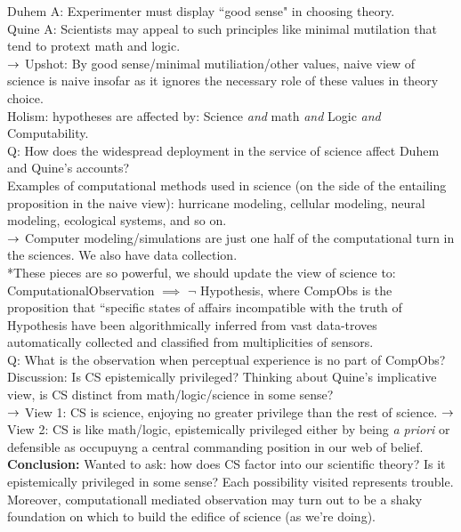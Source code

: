 Duhem A: Experimenter must display ``good sense" in choosing theory. \\

Quine A: Scientists may appeal to such principles like minimal mutilation that tend to protext math and logic. \\

$\rightarrow$ Upshot: By good sense/minimal mutiliation/other values, naive view of science is naive insofar as it ignores the necessary role of these values in theory choice. \\

Holism: hypotheses are affected by: Science {\it and} math {\it and} Logic {\it and} Computability. \\

Q: How does the widespread deployment in the service of science affect Duhem and Quine's accounts? \\

Examples of computational methods used in science (on the side of the entailing proposition in the naive view): hurricane modeling, cellular modeling, neural modeling, ecological systems, and so on. \\

$\rightarrow$ Computer modeling/simulations are just one half of the computational turn in the sciences. We also have data collection. \\

*These pieces are so powerful, we should update the view of science to: ComputationalObservation $\implies$ $\neg$ Hypothesis, where CompObs is the proposition that ``specific states of affairs incompatible with the truth of Hypothesis have been algorithmically inferred from vast data-troves automatically collected and classified from multiplicities of sensors. \\

Q: What is the observation when perceptual experience is no part of CompObs?\\

Discussion: Is CS epistemically privileged? Thinking about Quine's implicative view, is CS distinct from math/logic/science in some sense? \\

$\rightarrow$ View 1: CS is science, enjoying no greater privilege than the rest of science.
$\rightarrow$ View 2: CS is like math/logic, epistemically privileged either by being {\it a priori} or defensible as occupuyng a central commanding position in our web of belief. \\


{\bf Conclusion:} Wanted to ask: how does CS factor into our scientific theory? Is it epistemically privileged in some sense? Each possibility visited represents trouble. Moreover, computationall mediated observation may turn out to be a shaky foundation on which to build the edifice of science (as we're doing).


\spacerule








